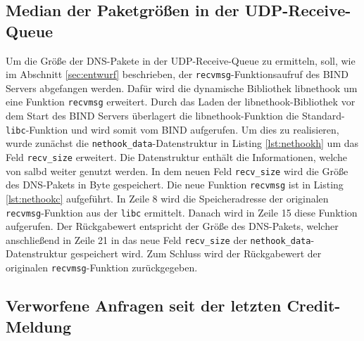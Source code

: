 \documentclass[a4paper, 12pt, BCOR10mm, DIV12, toc=bibliography, toc=listof, german]{scrbook}
\begin{document}
			


			\subsection*{Median der Paketgrößen in der UDP-Receive-Queue} %

				Um die Größe der DNS-Pakete in der UDP-Receive-Queue zu ermitteln, soll, wie im Abschnitt
				\ref{sec:entwurf} beschrieben, der \texttt{recvmsg}-Funktionsaufruf des BIND Servers
				abgefangen werden. Dafür wird die dynamische Bibliothek libnethook um eine Funktion
				\texttt{recvmsg} erweitert. Durch das Laden der libnethook-Bibliothek vor dem Start des BIND
				Servers überlagert die libnethook-Funktion die Standard-\texttt{libc}-Funktion und wird
				somit vom BIND aufgerufen. Um dies zu realisieren, wurde zunächst die
				\texttt{nethook\_data}-Datenstruktur in Listing \ref{lst:nethookh} um das Feld
				\texttt{recv\_size} erweitert. Die Datenstruktur enthält die Informationen, welche von salbd
				weiter genutzt werden. In dem neuen Feld \texttt{recv\_size} wird die Größe des DNS-Pakets
				in Byte gespeichert. Die neue Funktion \texttt{recvmsg} ist in Listing \ref{lst:nethookc}
				aufgeführt. In Zeile 8 wird die Speicheradresse der originalen \texttt{recvmsg}-Funktion aus
				der \texttt{libc} ermittelt. Danach wird in Zeile 15 diese Funktion
				aufgerufen. Der Rückgabewert entspricht der Größe des
				DNS-Pakets, welcher anschließend in Zeile 21 in das neue Feld \texttt{recv\_size} der
				\texttt{nethook\_data}-Datenstruktur gespeichert wird. Zum Schluss wird der Rückgabewert der
				originalen \texttt{recvmsg}-Funktion zurückgegeben.

			
			


			\subsection*{Verworfene Anfragen seit der letzten Credit-Meldung} %
\end{document}
